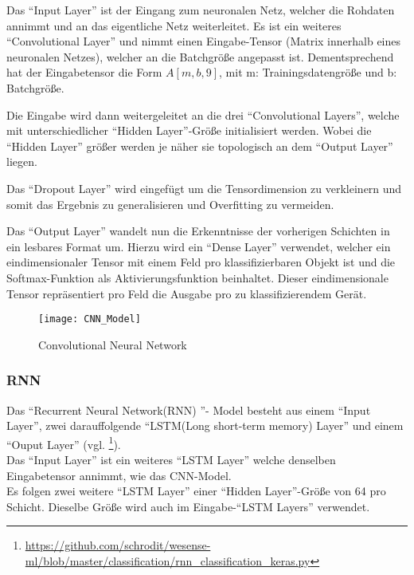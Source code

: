    \noindent
    Das "`Input Layer"' ist der Eingang zum neuronalen Netz, welcher die Rohdaten annimmt und an das eigentliche Netz weiterleitet. 
    Es ist ein weiteres "`Convolutional Layer"' und nimmt einen Eingabe-Tensor (Matrix innerhalb eines neuronalen Netzes), welcher an die Batchgröße angepasst ist.
    Dementsprechend hat der Eingabetensor die Form \( A[m, b, 9] \), mit m: Trainingsdatengröße und b: Batchgröße.
    \newline

    \noindent
    Die Eingabe wird dann weitergeleitet an die drei "`Convolutional Layers"', welche mit unterschiedlicher "`Hidden Layer"'-Größe initialisiert werden.
    Wobei die "`Hidden Layer"' größer werden je näher sie topologisch an dem "`Output Layer"' liegen.
    \newline

    \noindent
    Das "`Dropout Layer"' wird eingefügt um die Tensordimension zu verkleinern und somit das Ergebnis zu generalisieren und Overfitting zu vermeiden.
    \newline

    \noindent
    Das "`Output Layer"' wandelt nun die Erkenntnisse der vorherigen Schichten in ein lesbares Format um. 
    Hierzu wird ein "`Dense Layer"' verwendet, welcher ein eindimensionaler Tensor mit einem Feld pro klassifizierbaren Objekt ist und die Softmax-Funktion als Aktivierungsfunktion beinhaltet.
    Dieser eindimensionale Tensor repräsentiert pro Feld die Ausgabe pro zu klassifizierendem Gerät.     
    
    \begin{figure}[H]
        \centering
        \texttt{[image: CNN\_Model]}
        \caption{Convolutional Neural Network \protect\cite{Tensorboard}}
        \label{fig:CNN_MODEL}
    \end{figure}

    \subsubsection{RNN}
    Das "`Recurrent Neural Network(RNN) "'- Model besteht aus einem "`Input Layer"', zwei darauffolgende "`LSTM(Long short-term memory) Layer"' und einem "`Ouput Layer"' (vgl. \footnote{\url{https://github.com/schrodit/wesense-ml/blob/master/classification/rnn_classification_keras.py}}).\\
    \noindent
    Das "`Input Layer"' ist ein weiteres "`LSTM Layer"' welche denselben Eingabetensor annimmt, wie das CNN-Model.\\
    \noindent
    Es folgen zwei weitere "`LSTM Layer"' einer "`Hidden Layer"'-Größe von 64 pro Schicht.
    Dieselbe Größe wird auch im Eingabe-"`LSTM Layers"' verwendet.
    \newline

